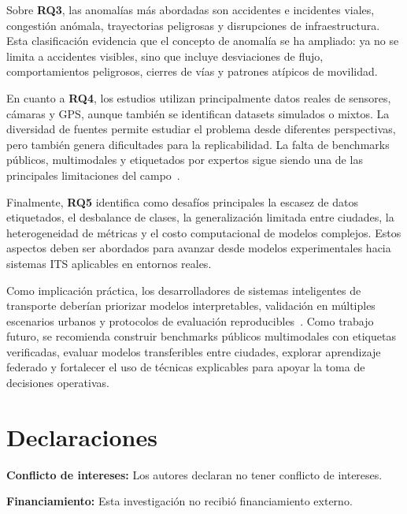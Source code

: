 \documentclass[12pt, a4paper]{article}
\begin{document}
Sobre \textbf{RQ3}, las anomal\'{i}as m\'{a}s abordadas son accidentes e incidentes viales, congesti\'{o}n an\'{o}mala, trayectorias peligrosas y disrupciones de infraestructura. Esta clasificaci\'{o}n evidencia que el concepto de anomal\'{i}a se ha ampliado: ya no se limita a accidentes visibles, sino que incluye desviaciones de flujo, comportamientos peligrosos, cierres de v\'{i}as y patrones at\'{i}picos de movilidad.

En cuanto a \textbf{RQ4}, los estudios utilizan principalmente datos reales de sensores, c\'{a}maras y GPS, aunque tambi\'{e}n se identifican datasets simulados o mixtos. La diversidad de fuentes permite estudiar el problema desde diferentes perspectivas, pero tambi\'{e}n genera dificultades para la replicabilidad. La falta de benchmarks p\'{u}blicos, multimodales y etiquetados por expertos sigue siendo una de las principales limitaciones del campo~\cite{taheri2026applicability}.

Finalmente, \textbf{RQ5} identifica como desaf\'{i}os principales la escasez de datos etiquetados, el desbalance de clases, la generalizaci\'{o}n limitada entre ciudades, la heterogeneidad de m\'{e}tricas y el costo computacional de modelos complejos. Estos aspectos deben ser abordados para avanzar desde modelos experimentales hacia sistemas ITS aplicables en entornos reales.

Como implicaci\'{o}n pr\'{a}ctica, los desarrolladores de sistemas inteligentes de transporte deber\'{i}an priorizar modelos interpretables, validaci\'{o}n en m\'{u}ltiples escenarios urbanos y protocolos de evaluaci\'{o}n reproducibles~\cite{abdallah2025aipurban}. Como trabajo futuro, se recomienda construir benchmarks p\'{u}blicos multimodales con etiquetas verificadas, evaluar modelos transferibles entre ciudades, explorar aprendizaje federado y fortalecer el uso de t\'{e}cnicas explicables para apoyar la toma de decisiones operativas.

\section*{Declaraciones}

\textbf{Conflicto de intereses:} Los autores declaran no tener conflicto de intereses.

\textbf{Financiamiento:} Esta investigaci\'{o}n no recibi\'{o} financiamiento externo.
\end{document}
